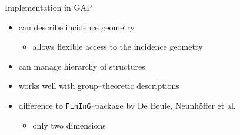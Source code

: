 \documentclass[11pt]{beamer}
\begin{document}
\begin{frame}{Implementation in GAP}
        \begin{itemize}
            \item<2-> can describe incidence geometry
                \begin{itemize}
                    \item<3-> allows flexible access to the incidence geometry
                \end{itemize}
            \item<4-> can manage hierarchy of structures
            \item<5-> works well with group--theoretic descriptions
            \item<6-> difference to \texttt{FinInG}--package by De Beule, Neunhöffer et al.
                \begin{itemize}
                    \item<7-> only two dimensions 
                \end{itemize}
        \end{itemize}
\end{frame}


\begin{frame}
    \tableofcontents[pausesections]
\end{frame}



            
\end{document}
